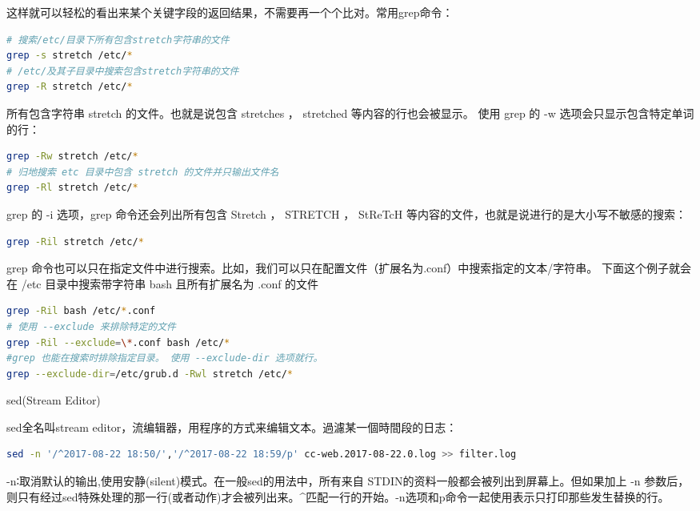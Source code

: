 \documentclass[12pt]{book}
\makeatletter
\numberwithin{dummy}{section}
\theoremstyle{ocrenumbox}
\theoremstyle{blacknumex}
\theoremstyle{blacknumbox}
\theoremstyle{ocrenum}
\renewcommand\paragraph{\@startsection{paragraph}{4}{\z@}
	{-2ex \@plus-.2ex \@minus .2ex}
	{.1ex}
	{\normalfont\small\sffamily\bfseries}}
\makeatother
\begin{document}
这样就可以轻松的看出来某个关键字段的返回结果，不需要再一个个比对。常用grep命令：

\begin{lstlisting}[language=Bash]
# 搜索/etc/目录下所有包含stretch字符串的文件
grep -s stretch /etc/*
# /etc/及其子目录中搜索包含stretch字符串的文件
grep -R stretch /etc/*
\end{lstlisting}

所有包含字符串 stretch 的文件。也就是说包含 stretches ， stretched 等内容的行也会被显示。 使用 grep 的 -w 选项会只显示包含特定单词的行：

\begin{lstlisting}[language=Bash]
grep -Rw stretch /etc/*
# 归地搜索 etc 目录中包含 stretch 的文件并只输出文件名
grep -Rl stretch /etc/*
\end{lstlisting}

grep 的 -i 选项，grep 命令还会列出所有包含 Stretch ， STRETCH ， StReTcH 等内容的文件，也就是说进行的是大小写不敏感的搜索：

\begin{lstlisting}[language=Bash]
grep -Ril stretch /etc/*
\end{lstlisting}

grep 命令也可以只在指定文件中进行搜索。比如，我们可以只在配置文件（扩展名为.conf）中搜索指定的文本/字符串。 下面这个例子就会在 /etc 目录中搜索带字符串 bash 且所有扩展名为 .conf 的文件

\begin{lstlisting}[language=Bash]
grep -Ril bash /etc/*.conf
# 使用 --exclude 来排除特定的文件
grep -Ril --exclude=\*.conf bash /etc/*
#grep 也能在搜索时排除指定目录。 使用 --exclude-dir 选项就行。
grep --exclude-dir=/etc/grub.d -Rwl stretch /etc/*
\end{lstlisting}


\paragraph{sed(Stream Editor)}

sed全名叫stream editor，流编辑器，用程序的方式来编辑文本。過濾某一個時間段的日志：

\begin{lstlisting}[language=Bash]
sed -n '/^2017-08-22 18:50/','/^2017-08-22 18:59/p' cc-web.2017-08-22.0.log >> filter.log
\end{lstlisting}

-n∶取消默认的输出,使用安静(silent)模式。在一般sed的用法中，所有来自 STDIN的资料一般都会被列出到屏幕上。但如果加上 -n 参数后，则只有经过sed特殊处理的那一行(或者动作)才会被列出来。\^{}匹配一行的开始。-n选项和p命令一起使用表示只打印那些发生替换的行。
\end{document}
